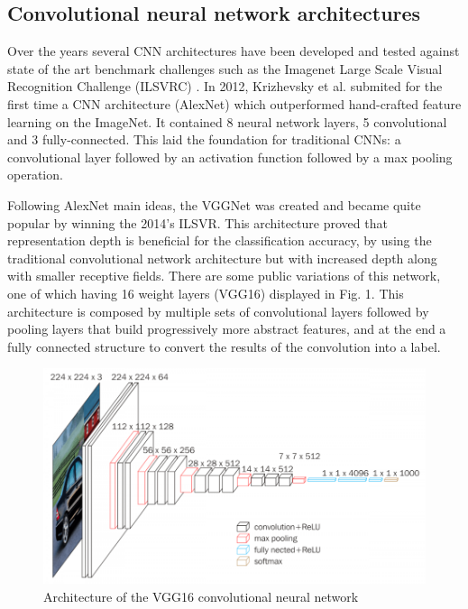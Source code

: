 \subsection{Convolutional neural network architectures}
Over the years several CNN architectures have been developed and tested against state of the art benchmark challenges such as the Imagenet Large Scale Visual Recognition Challenge (ILSVRC) \cite{ilsvrc}. In 2012, Krizhevsky et al. \cite{alexnet} submited for the first time a CNN architecture (AlexNet) which outperformed hand-crafted feature learning on the ImageNet. It contained 8 neural network layers, 5 convolutional and 3 fully-connected. This laid the foundation for traditional CNNs: a convolutional layer followed by an activation function followed by a max pooling operation. \par
Following AlexNet main ideas, the VGGNet\cite{vggnet} was created and became quite popular by winning the 2014’s ILSVR. This architecture proved that representation depth is beneficial for the classification accuracy, by using the traditional convolutional network architecture but with increased depth along with smaller receptive fields. There are some public variations of this network, one of which having 16 weight layers (VGG16) displayed in Fig. 1. This architecture is composed by multiple sets of convolutional layers followed by pooling layers that build progressively more abstract features, and at the end a fully connected structure to convert the results of the convolution into a label.
\begin{figure}[ht]
  \centering
    \includegraphics[scale=0.5, width=\linewidth]{figs/vgg16.png}
  \caption{Architecture of the VGG16 convolutional neural network \cite{vggnet}}
\end{figure}
